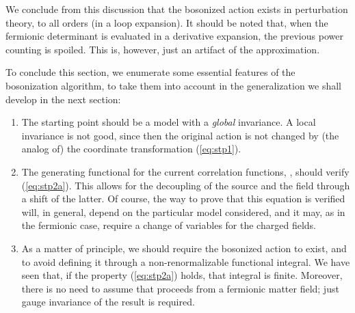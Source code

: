 \documentclass[a4paper,12pt]{article}
\begin{document}
We conclude
from this discussion that the bosonized action exists in perturbation
theory, to all orders (in a loop expansion). It should be noted that,
when the fermionic determinant is evaluated in a derivative expansion,
the previous power counting is spoiled. This is, however, just an
artifact of the approximation.

To conclude this section, we enumerate some essential features of the
bosonization algorithm, to take them into account in the
generalization we shall develop in the next section:
\begin{enumerate}

\item The starting point should be a model with a {\em global\/}
  \coordHE{} invariance. A local invariance is not good, since then the
  original action is not changed by (the analog of) the coordinate
  transformation (\ref{eq:stp1}).
\item The generating functional for the current correlation functions,
  \coordHE{}, should verify (\ref{eq:stp2a}). This allows for
  the decoupling of the source \coordHE{} and the \coordHE{} field through a
  shift of the latter. Of course, the way to prove that this equation
  is verified will, in general, depend on the particular model
  considered, and it may, as in the fermionic case, require a change
  of variables for the charged fields.
\item As a matter of principle, we should require the bosonized action
  to exist, and to avoid defining it through a non-renormalizable
  functional integral. We have seen that, if the property
  (\ref{eq:stp2a}) holds, that integral is finite. Moreover, there is
  no need to assume that \coordHE{} proceeds from a
  fermionic matter field; just gauge invariance of the result is
  required.
\end{enumerate}
\end{document}
